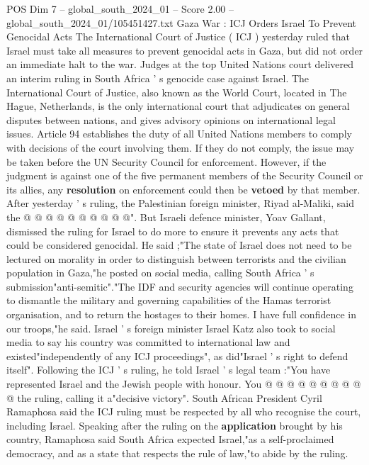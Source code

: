 \begin{textsample}{POS Dim 7 – global\_south\_2024\_01 – Score 2.00 – global\_south\_2024\_01/105451427.txt}  \label{ex:f7_pos_045}
Gaza War : ICJ Orders Israel To Prevent Genocidal Acts The International Court of Justice ( ICJ ) yesterday ruled that Israel must take all measures to prevent genocidal acts in Gaza, but did not order an immediate halt to the war.
Judges at the top United Nations court delivered an interim ruling in South Africa ' s genocide case against Israel.
The International Court of Justice, also known as the World Court, located in The Hague, Netherlands, is the only international court that adjudicates on general disputes between nations, and gives advisory opinions on international legal issues.
Article 94 establishes the duty of all United Nations members to comply with decisions of the court involving them.
If they do not comply, the issue may be taken before the UN Security Council for enforcement.
However, if the judgment is against one of the five permanent members of the Security Council or its allies, any \textbf{resolution} on enforcement could then be \textbf{vetoed} by that member.
After yesterday ' s ruling, the Palestinian foreign minister, Riyad al-Maliki, said the @ @ @ @ @ @ @ @ @ @".
But Israeli defence minister, Yoav Gallant, dismissed the ruling for Israel to do more to ensure it prevents any acts that could be considered genocidal.
He said ;"The state of Israel does not need to be lectured on morality in order to distinguish between terrorists and the civilian population in Gaza,"he posted on social media, calling South Africa ' s submission"anti-semitic"."The IDF and security agencies will continue operating to dismantle the military and governing capabilities of the Hamas terrorist organisation, and to return the hostages to their homes.
I have full confidence in our troops,"he said.
Israel ' s foreign minister Israel Katz also took to social media to say his country was committed to international law and existed"independently of any ICJ proceedings", as did"Israel ' s right to defend itself".
Following the ICJ ' s ruling, he told Israel ' s legal team :"You have represented Israel and the Jewish people with honour.
You @ @ @ @ @ @ @ @ @ @ the ruling, calling it a"decisive victory".
South African President Cyril Ramaphosa said the ICJ ruling must be respected by all who recognise the court, including Israel.
Speaking after the ruling on the \textbf{application} brought by his country, Ramaphosa said South Africa expected Israel,"as a self-proclaimed democracy, and as a state that respects the rule of law,"to abide by the ruling.

\end{textsample}
